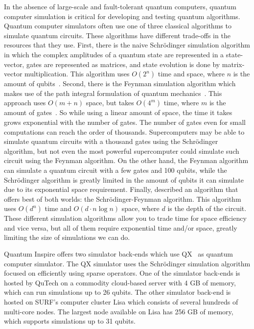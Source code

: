 In the absence of large-scale and fault-tolerant quantum computers, quantum computer simulation is critical for developing and testing quantum algorithms.
Quantum computer simulators often use one of three classical algorithms to simulate quantum circuits.
These algorithms have different trade-offs in the resources that they use.
First, there is the naive Schr{\"o}dinger simulation algorithm in which the complex amplitudes of a quantum state are represented in a state-vector, gates are represented as matrices, and state evolution is done by matrix-vector multiplication.
This algorithm uses $O(2^n)$ time and space, where $n$ is the amount of qubits~\cite{aaronson2016complexity}.
Second, there is the Feynman simulation algorithm which makes use of the path integral formulation of quantum mechanics~\cite{feynman2005space}.
This approach uses $O(m+n)$ space, but takes $O(4^m)$ time, where $m$ is the amount of gates~\cite{aaronson2016complexity}.
So while using a linear amount of space, the time it takes grows exponential with the number of gates.
The number of gates even for small computations can reach the order of thousands.
Supercomputers may be able to simulate quantum circuits with a thousand gates using the Schr{\"o}dinger  algorithm, but not even the most powerful supercomputer could simulate such circuit using the Feynman algorithm.
On the other hand, the Feynman algorithm can simulate a quantum circuit with a few gates and 100 qubits, while the Schr{\"o}dinger algorithm is greatly limited in the amount of qubits it can simulate due to its exponential space requirement.
Finally, \textcite{aaronson2016complexity} described an algorithm that offers best of both worlds: the Schr{\"o}dinger-Feynman algorithm.
This algorithm uses $O(d^n)$ time and $O(d \cdot n \log n)$ space, where $d$ is the depth of the circuit.
These different simulation algorithms allow you to trade time for space efficiency and vice versa, but all of them require exponential time and/or space, greatly limiting the size of simulations we can do.

Quantum Inspire offers two simulator back-ends which use QX~\cite{khammassi2017qx} as quantum computer simulator.
The QX simulator uses the Schr{\"o}dinger simulation algorithm focused on efficiently using sparse operators.
One of the simulator back-ends is hosted by QuTech on a commodity cloud-based server with 4 GB of memory, which can run simulations up to 26 qubits.
The other simulator back-end is hosted on SURF's computer cluster Lisa which consists of several hundreds of multi-core nodes.
The largest node available on Lisa has 256 GB of memory, which supports simulations up to 31 qubits.

